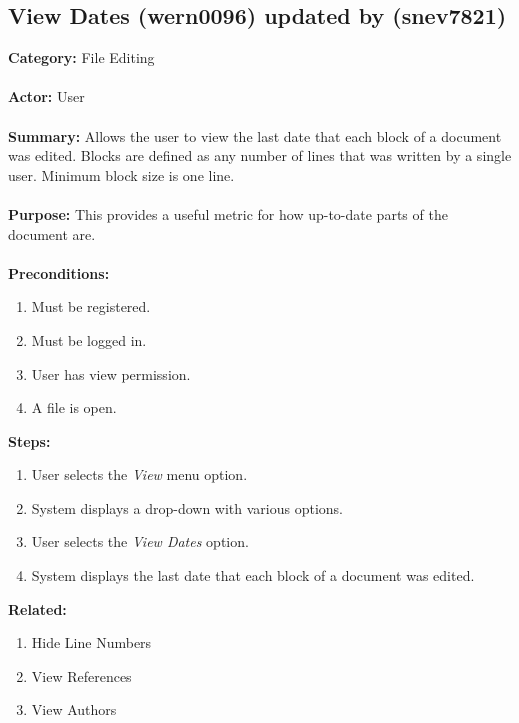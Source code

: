 \documentclass[11pt]{report}
\begin{document}
\subsection{View Dates (wern0096) updated by (snev7821)}
\begin{framed}

	\textbf{Category:} File Editing \\ \\
	\textbf{Actor:} User \\ \\
	\textbf{Summary:} Allows the user to view the last date that each block of a document was edited. Blocks are defined as any number of lines that was written by a single user. Minimum block size is one line. \\ \\
	\textbf{Purpose:} This provides a useful metric for how up-to-date parts of the document are. \\ \\
	\textbf{Preconditions:} 
	\begin{enumerate}
		\item Must be registered.
		\item Must be logged in.
		\item User has view permission.
		\item A file is open.
	\end{enumerate}
	\textbf{Steps:}
	\begin{enumerate}
		\item User selects the \textit{View} menu option.
		\item System displays a drop-down with various options.
		\item User selects the \textit{View Dates} option.
		\item System displays the last date that each block of a document was edited.
	\end{enumerate}
	\textbf{Related:}
	\begin{enumerate}
		\item Hide Line Numbers
		\item View References
		\item View Authors
	\end{enumerate}
\end{framed}

\newpage
\end{document}
